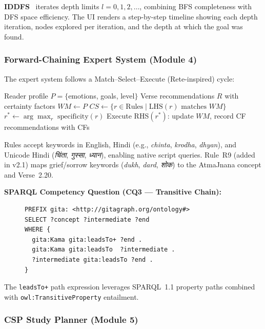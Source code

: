 \documentclass[conference]{IEEEtran}
\newcommand{\hi}[1]{{\hindifont #1}}
\begin{document}
\textbf{IDDFS}~\cite{korf1985depth} iterates depth limits $l = 0, 1, 2,\ldots$,
combining BFS completeness with DFS space efficiency. The UI renders a
step-by-step timeline showing each depth iteration, nodes explored per
iteration, and the depth at which the goal was found.

\subsubsection{Forward-Chaining Expert System (Module 4)}

The expert system follows a Match--Select--Execute (Rete-inspired) cycle:

\begin{algorithmic}
\REQUIRE Reader profile $P = \{$emotions, goals, level$\}$
\ENSURE Verse recommendations $R$ with certainty factors
\STATE $WM \leftarrow P$
\REPEAT
  \STATE $CS \leftarrow \{r \in \text{Rules} \mid \text{LHS}(r) \text{ matches } WM\}$
    \STATE $r^* \leftarrow \arg\max_r\;\text{specificity}(r)$
    \STATE Execute RHS$(r^*)$: update $WM$, record CF
  \ENDIF
{}
\RETURN recommendations with CFs
\end{algorithmic}

Rules accept keywords in English, Hindi (e.g., \textit{chinta}, \textit{krodha},
\textit{dhyan}), and Unicode Hindi (\textit{\hi{चिंता}}, \textit{\hi{गुस्सा}},
\textit{\hi{ध्यान}}), enabling native script queries. Rule~R9 (added in v2.1)
maps grief/sorrow keywords (\textit{dukh}, \textit{dard}, \textit{\hi{शोक}}) to
the AtmaJnana concept and Verse~2.20.

\textbf{SPARQL Competency Question (CQ3 — Transitive Chain):}
\begin{figure}[!t]
\begin{lstlisting}[language=SPARQL, caption={CQ3: Desire downfall chain via transitivity}]
PREFIX gita: <http://gitagraph.org/ontology#>
SELECT ?concept ?intermediate ?end
WHERE {
  gita:Kama gita:leadsTo+ ?end .
  gita:Kama gita:leadsTo  ?intermediate .
  ?intermediate gita:leadsTo ?end .
}
\end{lstlisting}
\end{figure}
The \texttt{leadsTo+} path expression leverages SPARQL~1.1 property paths
combined with \texttt{owl:TransitiveProperty} entailment.

\subsubsection{CSP Study Planner (Module 5)}
\end{document}
